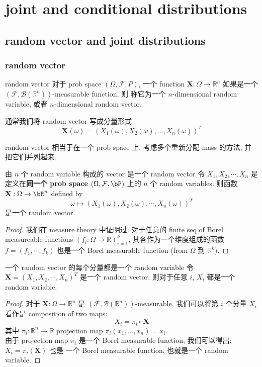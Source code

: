 \chapter{joint and conditional distributions}
\section{random vector and joint distributions}
\subsection{random vector}
\begin{definition}{random vector}
对于 prob space $(\Omega, \mathcal{F}, P)$, 
一个 function $\mathbf{X}: \Omega \to \mathbb{R}^n$ 如果是一个
$(\mathcal{F}, \mathcal{B}(\mathbb{R}^n))$-measurable function, 则
称它为一个 $n$-dimensional random variable, 或者 $n$-dimensional random vector.

通常我们将 random vector 写成分量形式
$$\mathbf{X}(\omega) = (X_1(\omega), X_2(\omega), \dots, X_n(\omega))^T$$
\end{definition}
random vector 相当于在一个 prob space 上, 考虑多个重新分配 mass 的方法, 并把它们并列起来.
\begin{proposition}{由 \(n\) 个 random variable 构成的 vector 是一个 random vector}
    令 \(X_1, X_2, \cdots, X_n\) 
    是定义在\textbf{同一个 prob space} \((\Omega, \mathcal{F}, \bP)\) 
    上的 \(n\) 个 random variables. 则函数 \(\mathbf{X}: \Omega \to \bR^n\) defined by 
    \[
    \omega \mapsto (X_1(\omega), X_2(\omega), \cdots, X_n(\omega))^T
    \]
    是一个 random vector.
\end{proposition}
\begin{proof}
    我们在 measure theory 中证明过: 对于任意的 finite seq of Borel measureable functions 
    \( (  {f_i}: \Omega \to \mathbb{R} )_{i=1}^k\), 其各作为一个维度组成的函数
    \(f = (f_1,\cdots, f_k)\) 也是一个 Borel measurable function (from \(\Omega\) 到 \(\mathbb{R}^k\)).
\end{proof}
\begin{proposition}{一个 random vector 的每个分量都是一个 random variable}
    令 \(\mathbf{X} = (X_1, X_2, \cdots, X_n)^T\) 是一个 random vector. 
    则对于任意 \(i\), \(X_i\) 都是一个 random variable.
\end{proposition}
\begin{proof}
    对于 $\mathbf{X}: \Omega \to \mathbb{R}^n$ 是 $(\mathcal{F}, \mathcal{B}(\mathbb{R}^n))$-measurable,
    我们可以将第 $i$ 个分量 $X_i$ 看作是 composition of two maps: 
    $$X_i = \pi_i \circ \mathbf{X}$$
    其中 $\pi_i: \mathbb{R}^n \to \mathbb{R}$ projection map  $\pi_i(x_1, \dots, x_n) = x_i$.\\
    由于 projection map $\pi_i$ 是一个 Borel measurable function, 我们可以得出: \(X_i = \pi_i(\mathbf{X})\) 也是
一个 Borel measurable function, 也就是一个 random variable.
\end{proof}

